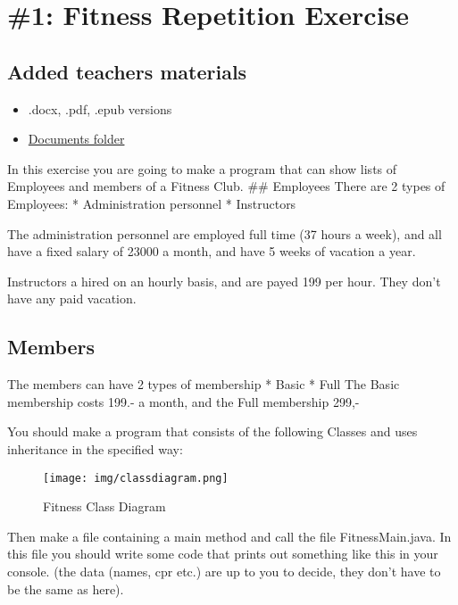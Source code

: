 \hypertarget{fitness-repetition-exercise}{%
\section{\#1: Fitness Repetition
Exercise}\label{fitness-repetition-exercise}}

\hypertarget{added-teachers-materials}{%
\subsection{Added teachers materials}\label{added-teachers-materials}}

\begin{itemize}
\tightlist
\item
  .docx, .pdf, .epub versions
\item
  \href{/documents}{Documents folder}
\end{itemize}

In this exercise you are going to make a program that can show lists of
Employees and members of a Fitness Club. \#\# Employees There are 2
types of Employees: * Administration personnel * Instructors

The administration personnel are employed full time (37 hours a week),
and all have a fixed salary of 23000 a month, and have 5 weeks of
vacation a year.

Instructors a hired on an hourly basis, and are payed 199 per hour. They
don't have any paid vacation.

\hypertarget{members}{%
\subsection{Members}\label{members}}

The members can have 2 types of membership * Basic * Full The Basic
membership costs 199.- a month, and the Full membership 299,-

You should make a program that consists of the following Classes and
uses inheritance in the specified way:

\begin{figure}
\centering
\texttt{[image: img/classdiagram.png]}
\caption{Fitness Class Diagram}
\end{figure}

Then make a file containing a main method and call the file
FitnessMain.java. In this file you should write some code that prints
out something like this in your console. (the data (names, cpr etc.) are
up to you to decide, they don't have to be the same as here).


